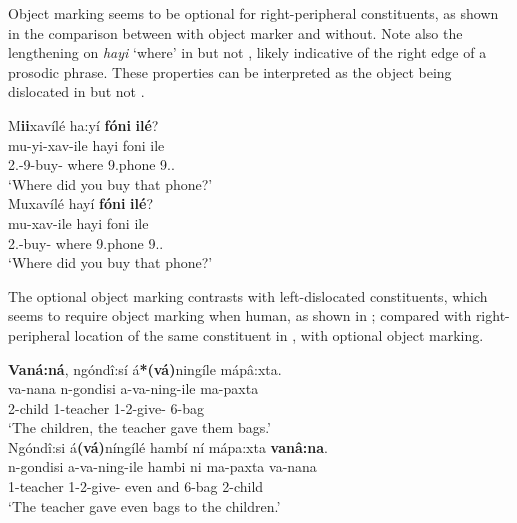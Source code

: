 \documentclass[output=paper]{langscibook}
\begin{document}
\z

Object marking seems to be optional for right-peripheral constituents, as shown in the comparison between  with object marker and  without. Note also the lengthening on \textit{hayi} ‘where’ in  but not , likely indicative of the right edge of a prosodic phrase. These properties can be interpreted as the object being dislocated in  but not .

\ea\label{bkm:Ref124152723}
\ea
\label{bkm:Ref124152723:a}
M\textbf{ii}xavílé ha:yí \textbf{fóni} \textbf{ilé}?\\
\gll
mu-yi-xav-ile  hayi  foni  ile\\
2\PL.\SM{}-9\OM{}-buy-\PFV{}  where  9.phone  9.\DEM{}.\MED{}\\
\glt
‘Where did you buy that phone?’\\


\ex
\label{bkm:Ref124152723:b}
Muxavílé hayí \textbf{fóni} \textbf{ilé}?\\
\gll
mu-xav-ile  hayi  foni  ile\\
2\PL.\SM{}-buy-\PFV{}  where  9.phone  9.\DEM{}.\MED{}\\
\glt
‘Where did you buy that phone?’\\

\z
\z

The optional object marking contrasts with left-dislocated constituents, which seems to require object marking when human, as shown in ; compared with right-peripheral location of the same constituent in , with optional object marking.

\ea\label{bkm:Ref127260966}
\ea
\label{bkm:Ref127260966:a}
\textbf{Vaná:ná}, ngóndî:sí á\textbf{*(vá)}ningíle mápâ:xta.\\
\gll
va-nana  n-gondisi  a-va-ning-ile  ma-paxta\\
2-child  1-teacher  1\SM{}-2\OM{}-give-\PFV{}  6-bag\\
\glt
‘The children, the teacher gave them bags.’\\


\ex
\label{bkm:Ref127260966:b}
Ngóndî:si á\textbf{(vá)}níngílé hambí ní mápa:xta \textbf{vanâ:na}.\\
\gll
n-gondisi  a-va-ning-ile  hambi  ni  ma-paxta  va-nana\\
1-teacher  1\SM{}-2\OM{}-give-\PFV{}  even  and  6-bag  2-child\\
\glt
‘The teacher gave even bags to the children.’\\
\end{document}
